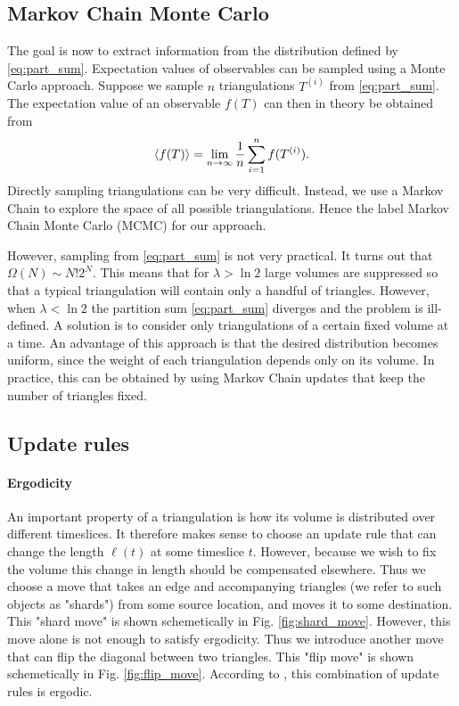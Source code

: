 
\subsection{Markov Chain Monte Carlo}

The goal is now to extract information from the distribution defined by \eqref{eq:part_sum}. Expectation values of observables can be sampled using a Monte Carlo approach. Suppose we sample $n$ triangulations $T^{(i)}$ from \eqref{eq:part_sum}. The expectation value of an observable $f(T)$ can then in theory be obtained from
\begin{equation}
    \ev{f(T)}
    =
    \lim_{n \to \infty} \frac{1}{n} \sum_{i = 1}^n f(T^{(i)})
    .
\end{equation}
Directly sampling triangulations can be very difficult. Instead, we use a Markov Chain to explore the space of all possible triangulations. Hence the label Markov Chain Monte Carlo (MCMC) for our approach.

However, sampling from \eqref{eq:part_sum} is not very practical. It turns out that $\Omega(N) \sim N! 2^N$. This means that for $\lambda > \ln 2$ large volumes are suppressed so that a typical triangulation will contain only a handful of triangles.
However, when $\lambda < \ln 2$ the partition sum \eqref{eq:part_sum} diverges and the problem is ill-defined.
A solution is to consider only triangulations of a certain fixed volume at a time.
An advantage of this approach is that the desired distribution becomes uniform, since the weight of each triangulation depends only on its volume.
In practice, this can be obtained by using Markov Chain updates that keep the number of triangles fixed.

\subsection{Update rules}
\paragraph{Ergodicity}
An important property of a triangulation is how its volume is distributed over different timeslices. It therefore makes sense to choose an update rule that can change the length $\ell(t)$ at some timeslice $t$. However, because we wish to fix the volume this change in length should be compensated elsewhere. Thus we choose a move that takes an edge and accompanying triangles (we refer to such objects as "shards") from some source location, and moves it to some destination. This "shard move" is shown schemetically in Fig. \ref{fig:shard_move}. However, this move alone is not enough to satisfy ergodicity. Thus we introduce another move that can flip the diagonal between two triangles. This "flip move" is shown schemetically in Fig. \ref{fig:flip_move}. According to \cite{2012}, this combination of update rules is ergodic.

